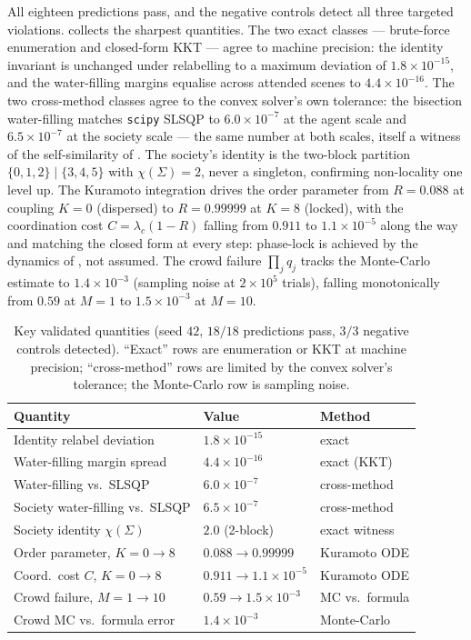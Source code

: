 \documentclass[11pt,twocolumn,a4paper]{article}
\newcommand{\Char}{\chi}             %
\newcommand{\Ord}{R}                 %
\newcommand{\Soc}{\Sigma}            %
\begin{document}
All eighteen predictions pass, and the negative controls detect all three
targeted violations.  collects the sharpest quantities.
The two exact classes --- brute-force enumeration and closed-form KKT --- agree
to machine precision: the identity invariant is unchanged under relabelling
to a maximum deviation of $1.8\times10^{-15}$, and the water-filling margins
equalise across attended scenes to $4.4\times10^{-16}$. The two
cross-method classes agree to the convex solver's own tolerance: the
bisection water-filling matches \texttt{scipy} SLSQP to $6.0\times10^{-7}$
at the agent scale and $6.5\times10^{-7}$ at the society scale --- the same
number at both scales, itself a witness of the self-similarity of
. The society's identity is the two-block partition
$\{0,1,2\}\mid\{3,4,5\}$ with $\Char(\Soc)=2$, never a singleton, confirming
non-locality one level up. The Kuramoto integration drives the order
parameter from $\Ord=0.088$ at coupling $K=0$ (dispersed) to
$\Ord=0.99999$ at $K=8$ (locked), with the coordination cost
$C=\lambda_c(1-\Ord)$ falling from $0.911$ to $1.1\times10^{-5}$ along the
way and matching the closed form at every step: phase-lock is achieved by
the dynamics of , not assumed. The crowd failure
$\prod_j q_j$ tracks the Monte-Carlo estimate to $1.4\times10^{-3}$
(sampling noise at $2\times10^5$ trials), falling monotonically from
$0.59$ at $M=1$ to $1.5\times10^{-3}$ at $M=10$.

\begin{table}[h]
\centering
\small
\caption{Key validated quantities (seed $42$, $18/18$ predictions pass,
$3/3$ negative controls detected). ``Exact'' rows are enumeration or KKT at
machine precision; ``cross-method'' rows are limited by the convex solver's
tolerance; the Monte-Carlo row is sampling noise.}
\label{tab:validation}
\begin{tabular}{@{}lll@{}}
\toprule
Quantity & Value & Method \\
\midrule
Identity relabel deviation & $1.8\times10^{-15}$ & exact \\
Water-filling margin spread & $4.4\times10^{-16}$ & exact (KKT) \\
Water-filling vs.\ SLSQP & $6.0\times10^{-7}$ & cross-method \\
Society water-filling vs.\ SLSQP & $6.5\times10^{-7}$ & cross-method \\
Society identity $\Char(\Soc)$ & $2.0$ (2-block) & exact witness \\
Order parameter, $K{=}0\!\to\!8$ & $0.088\to0.99999$ & Kuramoto ODE \\
Coord.\ cost $C$, $K{=}0\!\to\!8$ & $0.911\to1.1\!\times\!10^{-5}$ &
  Kuramoto ODE \\
Crowd failure, $M{=}1\!\to\!10$ & $0.59\to1.5\!\times\!10^{-3}$ &
  MC vs.\ formula \\
Crowd MC vs.\ formula error & $1.4\times10^{-3}$ & Monte-Carlo \\
\bottomrule
\end{tabular}
\end{table}
\end{document}
